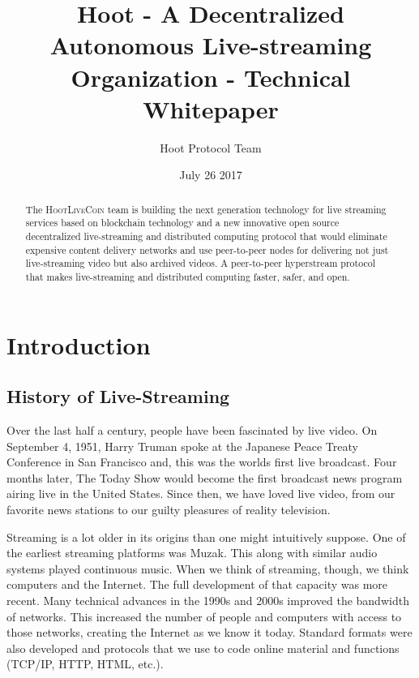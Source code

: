 \documentclass{article}
\title{Hoot - A Decentralized Autonomous Live-streaming Organization - Technical Whitepaper}
\author{Hoot Protocol Team}
\date{July 26 2017}
\begin{document}
\maketitle

\begin{abstract}
The \textsc{HootLiveCoin} team is building the next generation technology for live streaming services based on blockchain technology and a new innovative open source decentralized live-streaming and distributed computing protocol that would eliminate expensive content delivery networks and use peer-to-peer nodes for delivering not just live-streaming video but also archived videos. A peer-to-peer hyperstream protocol that makes live-streaming and distributed computing faster, safer, and open.

\end{abstract}
\newpage

\tableofcontents
\newpage

\section{Introduction}
\subsection{History of Live-Streaming}
Over the last half a century, people have been fascinated by live video. On September 4, 1951, Harry Truman spoke at the Japanese Peace Treaty Conference in San Francisco and, this was the worlds first live broadcast. Four months later, The Today Show would become the first broadcast news program airing live in the United States. Since then, we have loved live video, from our favorite news stations to our guilty pleasures of reality television.

Streaming is a lot older in its origins than one might intuitively suppose. One of the earliest streaming platforms was Muzak. This along with similar audio systems played continuous music. When we think of streaming, though, we think computers and the Internet. The full development of that capacity was more recent. Many technical advances in the 1990s and 2000s improved the bandwidth of networks. This increased the number of people and computers with access to those networks, creating the Internet as we know it today. Standard formats were also developed and protocols that we use to code online material and functions (TCP/IP, HTTP, HTML, etc.).
\end{document}
